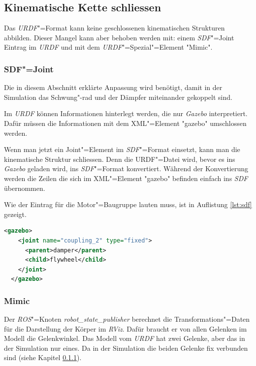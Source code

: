 \subsection{Kinematische Kette schliessen}
\label{chap:kin-schliessen}
Das \textit{URDF}"=Format kann keine geschlossenen kinematischen Strukturen abbilden.
Dieser Mangel kann aber behoben werden mit: einem \textit{SDF}"=Joint Eintrag im \textit{URDF} und mit dem \textit{URDF}"=Spezial"=Element \textsc{"}Mimic\textsc{"}.

\subsubsection{SDF"=Joint}
\label{chap:sdf-joint}
Die in diesem Abschnitt erklärte Anpassung wird benötigt, damit in der Simulation das Schwung"-rad und der Dämpfer miteinander gekoppelt sind.

Im \textit{URDF} können Informationen hinterlegt werden, die nur \textit{Gazebo} interpretiert.
Dafür müssen die Informationen mit dem XML"=Element \textsc{"}gazebo\textsc{"} umschlossen werden.

Wenn man jetzt ein Joint"=Element im \textit{SDF}"=Format einsetzt, kann man die kinematische Struktur schliessen.
Denn die {URDF}"=Datei wird, bevor es ins \textit{Gazebo} geladen wird, ins \textit{SDF}"=Format konvertiert.
Während der Konvertierung werden die Zeilen die sich im XML"=Element \textsc{"}gazebo\textsc{"} befinden einfach ins \textit{SDF} übernommen.

Wie der Eintrag für die Motor"=Baugruppe lauten muss, ist in Auflistung \ref{lst:sdf} gezeigt.
\begin{lstlisting}[language=xml, captionpos=b, caption=SDF-Joint in URDF, label={lst:sdf}]
  <gazebo>
    <joint name="coupling_2" type="fixed">
      <parent>damper</parent>
      <child>flywheel</child>
    </joint>
  </gazebo>
\end{lstlisting}
\subsubsection{Mimic}
\label{chap:mimic}
Der \textit{ROS}"=Knoten \textit{robot\_state\_publisher} berechnet die Transformations"=Daten für die Darstellung der Körper im \textit{RViz}.
Dafür braucht er von allen Gelenken im Modell die Gelenkwinkel.
Das Modell vom \textit{URDF} hat zwei Gelenke, aber das in der Simulation nur eines.
Da in der Simulation die beiden Gelenke fix verbunden sind (siehe Kapitel \ref{chap:sdf-joint}).

